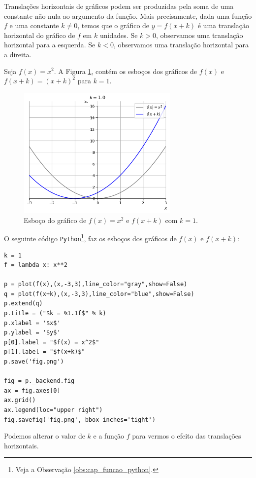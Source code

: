 Translações horizontais de gráficos podem ser produzidas pela soma de uma constante não nula ao argumento da função. Mais precisamente, dada uma função $f$ e uma constante $k\neq 0$, temos que o gráfico de $y=f(x+k)$ é uma translação horizontal do gráfico de $f$ em $k$ unidades. Se $k>0$, observamos uma translação horizontal para a esquerda. Se $k<0$, observamos uma translação horizontal para a direita.

\begin{ex}
  Seja $f(x) = x^2$. A Figura \ref{fig:ex_transhoriz}, contém os esboços dos gráficos de $f(x)$ e $f(x+k) = (x+k)^2$ para $k=1$.

  \begin{figure}[H]
    \centering
    \includegraphics[width=0.7\textwidth]{./cap_funcao/dados/fig_ex_transhoriz/fig_ex_transhoriz}
    \caption{Esboço do gráfico de $f(x) = x^2$ e $f(x+k)$ com $k=1$.}
    \label{fig:ex_transhoriz}
  \end{figure}

  \ifispython
  O seguinte código \verb+Python+\footnote{Veja a Observação \ref{obs:cap_funcao_python}.}, faz os esboços dos gráficos de $f(x)$ e $f(x+k)$:
\begin{verbatim}
k = 1
f = lambda x: x**2

p = plot(f(x),(x,-3,3),line_color="gray",show=False)
q = plot(f(x+k),(x,-3,3),line_color="blue",show=False)
p.extend(q)
p.title = ("$k = %1.1f$" % k)
p.xlabel = '$x$'
p.ylabel = '$y$'
p[0].label = "$f(x) = x^2$"
p[1].label = "$f(x+k)$"
p.save('fig.png')

fig = p._backend.fig
ax = fig.axes[0]
ax.grid()
ax.legend(loc="upper right")
fig.savefig('fig.png', bbox_inches='tight')
\end{verbatim}
  Podemos alterar o valor de $k$ e a função $f$ para vermos o efeito das translações horizontais.
  \fi
\end{ex}

